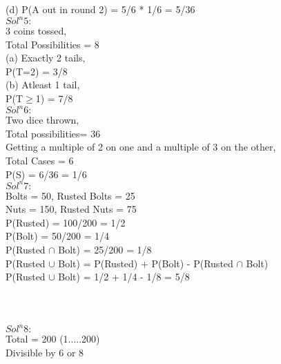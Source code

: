 \documentclass{article}
\begin{document}
(d) P(A out in round 2) = 5/6 * 1/6 = 5/36 \\

\textbf{$Sol^n 5:$} \\

3 coins tossed,\\

Total Possibilities = 8 \\

(a) Exactly 2 tails,\\

P(T=2) = 3/8 \\

(b) Atleast 1 tail, \\

P(T$\geq$1) = 7/8 \\

\textbf{$Sol^n 6:$} \\

Two dice thrown, \\
Total possibilities= 36 \\
Getting a multiple of 2 on one and a multiple of 3 on the other, \\
Total Cases = 6 \\

P(S) = 6/36 = 1/6 \\

\textbf{$Sol^n 7:$} \\

Bolts = 50, Rusted Bolts = 25 \\
Nuts = 150, Rusted Nuts = 75 \\
P(Rusted) = 100/200 = 1/2 \\
P(Bolt) = 50/200 = 1/4 \\
P(Rusted $\cap$ Bolt) = 25/200 = 1/8 \\

P(Rusted $\cup$ Bolt) = P(Rusted) + P(Bolt) - P(Rusted $\cap$ Bolt) \\

P(Rusted $\cup$ Bolt) = 1/2 + 1/4 - 1/8 = 5/8 \\
\\
\\
\\

\textbf{$Sol^n 8:$} \\

Total = 200 (1.....200) \\

Divisible by 6 or 8 
\\
\end{document}
